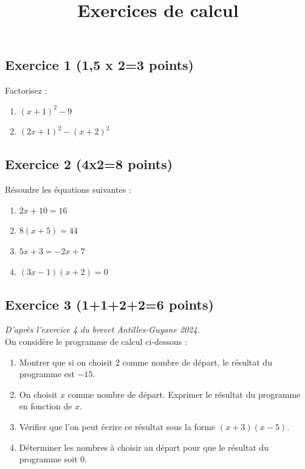 \documentclass[14 pt, fleqn, pstricks]{extarticle}
\title{Exercices de calcul}
\date{}
\theoremstyle{plain}
\begin{document}
	 

\subsection*{Exercice 1 (1,5 x 2=3 points)}
Factorisez : 
\begin{enumerate}
\item $(x+1)^2 - 9$
\item $(2x+1)^2 - (x+2)^2$
\end{enumerate}

\subsection*{Exercice 2 (4x2=8 points) }	
Résoudre les équations suivantes :
\begin{enumerate}
\item $2x+10 = 16$
\item $8(x+5) = 44$
\item $5x + 3 = -2x + 7$
\item $(3x-1)(x+2) = 0$
\end{enumerate}

\subsection*{Exercice 3 (1+1+2+2=6 points) }	 
\textit{D'après l'exercice 4 du brevet Antilles-Guyane 2024.}\\
 On considère le programme de calcul ci-dessous :\\\newline

\begin{enumerate}
	\item Montrer que si on choisit $2$ comme nombre de départ, le résultat du programme est $-15$.
	\item On choisit $x$ comme nombre de départ. Exprimer le résultat du programme en fonction de $x$.
	\item Vérifier que l'on peut écrire ce résultat sous la forme $(x+3)(x-5)$.
	\item Déterminer les nombres à choisir au départ pour que le résultat du programme soit 0.
\end{enumerate}
     
\end{document}
